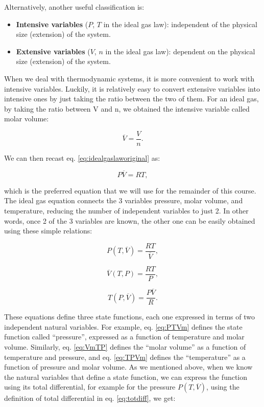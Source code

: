 \documentclass[
  9pt,
]{extbook}
\providecommand{\tightlist}{%
  \setlength{\itemsep}{0pt}\setlength{\parskip}{0pt}}
\theoremstyle{definition}
\theoremstyle{definition}
\theoremstyle{definition}
\theoremstyle{definition}
\theoremstyle{remark}
\begin{document}
Alternatively, another useful classification is:

\begin{itemize}
\tightlist
\item
  \textbf{Intensive variables} (\(P\), \(T\) in the ideal gas law): independent of the physical size (extension) of the system.
\item
  \textbf{Extensive variables} (\(V\), \(n\) in the ideal gas law): dependent on the physical size (extension) of the system.
\end{itemize}

When we deal with thermodynamic systems, it is more convenient to work with intensive variables. Luckily, it is relatively easy to convert extensive variables into intensive ones by just taking the ratio between the two of them. For an ideal gas, by taking the ratio between V and n, we obtained the intensive variable called molar volume:

\begin{equation}
  \overline{V}=\frac{V}{n}.   
  \label{eq:Vmdef}
\end{equation}

We can then recast eq. \eqref{eq:idealgaslaworiginal} as:

\begin{equation}
  P\overline{V}=RT,
  \label{eq:idealgaslaw}
\end{equation}

which is the preferred equation that we will use for the remainder of this course.
The ideal gas equation connects the 3 variables pressure, molar volume, and temperature, reducing the number of independent variables to just 2. In other words, once 2 of the 3 variables are known, the other one can be easily obtained using these simple relations:

\begin{equation}
  P(T,\overline{V})=\frac{RT}{\overline{V}},
  \label{eq:PTVm}
\end{equation}

\begin{equation}
  \overline{V}(T,P)=\frac{RT}{P},
  \label{eq:VmTP}
 \end{equation}

\begin{equation}
  T(P,\overline{V})=\frac{P\overline{V}}{R}.
  \label{eq:TPVm}
\end{equation}

These equations define three state functions, each one expressed in terms of two independent natural variables. For example, eq. \eqref{eq:PTVm} defines the state function called ``pressure'', expressed as a function of temperature and molar volume. Similarly, eq. \eqref{eq:VmTP} defines the ``molar volume'' as a function of temperature and pressure, and eq. \eqref{eq:TPVm} defines the ``temperature'' as a function of pressure and molar volume. As we mentioned above, when we know the natural variables that define a state function, we can express the function using its total differential, for example for the pressure \(P(T, \overline{V})\), using the definition of total differential in eq. \eqref{eq:totdiff}, we get:
\end{document}
